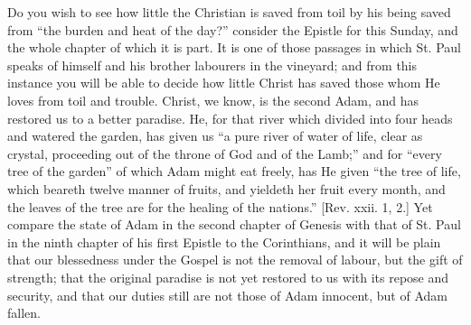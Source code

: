 Do you wish to see how little the Christian is saved from toil by
his being saved from ``the burden and heat of the day?''
consider the Epistle for this Sunday, and the whole chapter of which
it is part. It is one of those passages in which St. Paul speaks of
himself and his brother labourers in the vineyard; and from this
instance you will be able to decide how little Christ has saved those
whom He loves from toil and trouble. Christ, we know, is the second
Adam, and has restored us to a better paradise. He, for that river
which divided into four heads and watered the garden, has given us
``a pure river of water of life, clear as crystal, proceeding out
of the throne of God and of the Lamb;'' and for ``every tree
of the garden'' of which Adam might eat freely, has He given
``the tree of life, which beareth twelve manner of fruits, and
yieldeth her fruit every month, and the leaves of the tree are for the
healing of the nations.'' [Rev. xxii. 1, 2.] Yet compare the state
of Adam in the second chapter of Genesis with that of St. Paul in the
ninth chapter of his first Epistle to the Corinthians, and it will be
plain that our blessedness under the Gospel is not the removal of
labour, but the gift of strength; that the original paradise is not
yet restored to us with its repose and security, and that our duties
still are not those of Adam innocent, but of Adam fallen.

